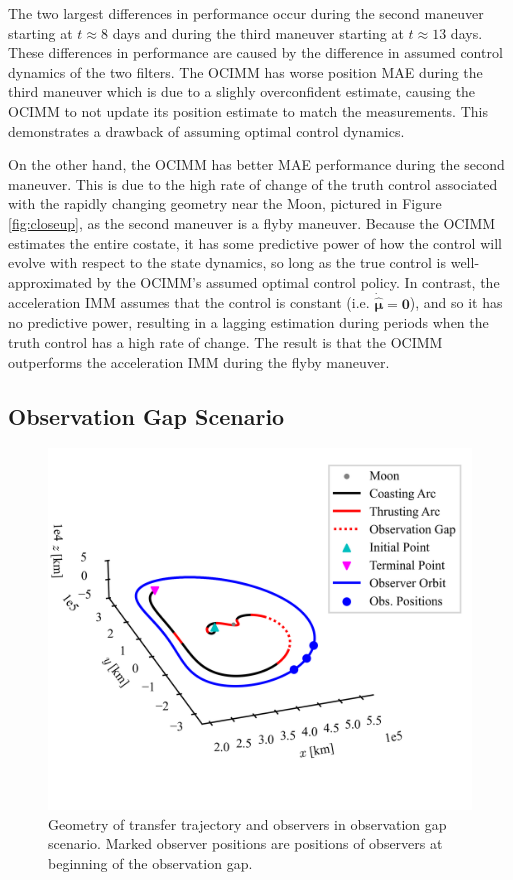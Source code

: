 \documentclass[letterpaper, preprint, paper,11pt]{AAS}	%
\begin{document}
The two largest differences in performance occur during the second maneuver starting at $t\approx 8$ days and during the third maneuver starting at $t\approx 13$ days. These differences in performance are caused by the difference in assumed control dynamics of the two filters. The OCIMM has worse position MAE during the third maneuver which is due to a slighly overconfident estimate, causing the OCIMM to not update its position estimate to match the measurements. This demonstrates a drawback of assuming optimal control dynamics.

On the other hand, the OCIMM has better MAE performance during the second maneuver. This is due to the high rate of change of the truth control associated with the rapidly changing geometry near the Moon, pictured in Figure \ref{fig:closeup}, as the second maneuver is a flyby maneuver. Because the OCIMM estimates the entire costate, it has some predictive power of how the control will evolve with respect to the state dynamics, so long as the true control is well-approximated by the OCIMM's assumed optimal control policy. In contrast, the acceleration IMM assumes that the control is constant (i.e. $\dot{\hat{\bm{\mu}}} = \bm{0}$), and so it has no predictive power, resulting in a lagging estimation during periods when the truth control has a high rate of change. The result is that the OCIMM outperforms the acceleration IMM during the flyby maneuver. 

\subsection{Observation Gap Scenario}

\begin{figure}
    \centering
    \includegraphics[width=0.5\linewidth]{Figures/unobserved_trajectory.png}
    \caption{Geometry of transfer trajectory and observers in observation gap scenario. Marked observer positions are positions of observers at beginning of the observation gap.}
    \label{fig:unobserved_trajectory}
\end{figure}
\end{document}
